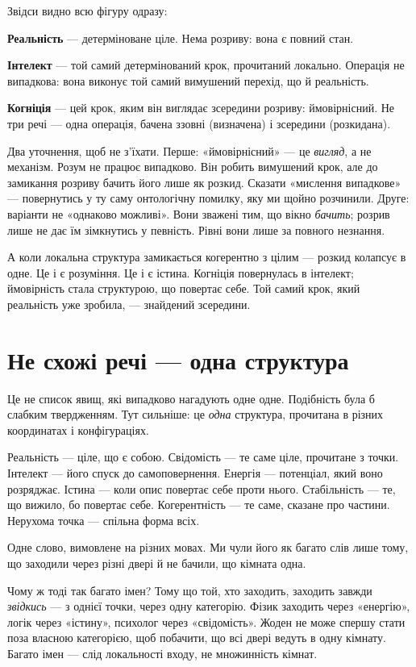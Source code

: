 \documentclass[12pt, a4paper, openany]{book}
\begin{document}
Звідси видно всю фігуру одразу:

\textbf{Реальність} --- детерміноване ціле. Нема розриву: вона є повний стан.

\textbf{Інтелект} --- той самий детермінований крок, прочитаний локально. Операція не випадкова: вона виконує той самий вимушений перехід, що й реальність.

\textbf{Когніція} --- цей крок, яким він виглядає зсередини розриву: ймовірнісний. Не три речі --- одна операція, бачена ззовні (визначена) і зсередини (розкидана).

Два уточнення, щоб не з'їхати. Перше: «ймовірнісний» --- це \emph{вигляд}, а не механізм. Розум не працює випадково. Він робить вимушений крок, але до замикання розриву бачить його лише як розкид. Сказати «мислення випадкове» --- повернутись у ту саму онтологічну помилку, яку ми щойно розчинили. Друге: варіанти не «однаково можливі». Вони зважені тим, що вікно \emph{бачить}; розрив лише не дає їм зімкнутись у певність. Рівні вони лише за повного незнання.

А коли локальна структура замикається когерентно з цілим --- розкид колапсує в одне. Це і є розуміння. Це і є істина. Когніція повернулась в інтелект; ймовірність стала структурою, що повертає себе. Той самий крок, який реальність уже зробила, --- знайдений зсередини.


\section{Не схожі речі --- одна структура}

Це не список явищ, які випадково нагадують одне одне. Подібність була б слабким твердженням. Тут сильніше: це \emph{одна} структура, прочитана в різних координатах і конфігураціях.

Реальність --- ціле, що є собою. Свідомість --- те саме ціле, прочитане з точки. Інтелект --- його спуск до самоповернення. Енергія --- потенціал, який воно розряджає. Істина --- коли опис повертає себе проти нього. Стабільність --- те, що вижило, бо повертає себе. Когерентність --- те саме, сказане про частини. Нерухома точка --- спільна форма всіх.

Одне слово, вимовлене на різних мовах. Ми чули його як багато слів лише тому, що заходили через різні двері й не бачили, що кімната одна.

\begin{notebox}
Чому ж тоді так багато імен? Тому що той, хто заходить, заходить завжди \emph{звідкись} --- з однієї точки, через одну категорію. Фізик заходить через «енергію», логік через «істину», психолог через «свідомість». Жоден не може спершу стати поза власною категорією, щоб побачити, що всі двері ведуть в одну кімнату. Багато імен --- слід локальності входу, не множинність кімнат.
\end{notebox}
\end{document}

